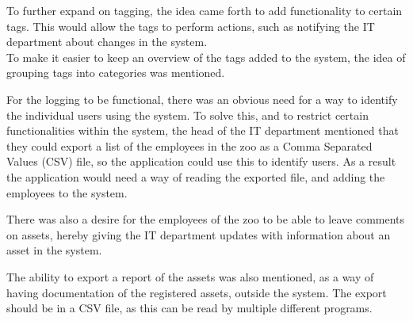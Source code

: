 \par
To further expand on tagging, the idea came forth to add functionality to certain tags. This would allow the tags to perform actions, such as notifying the IT department about changes in the system. \\
To make it easier to keep an overview of the tags added to the system, the idea of grouping tags into categories was mentioned.
\par
For the logging to be functional, there was an obvious need for a way to identify the individual users using the system. To solve this, and to restrict certain functionalities within the system, the head of the IT department mentioned that they could export a list of the employees in the zoo as a Comma Separated Values (CSV) file, so the application could use this to identify users. As a result the application would need a way of reading the exported file, and adding the employees to the system. 
\par
There was also a desire for the employees of the zoo to be able to leave comments on assets, hereby giving the IT department updates with information about an asset in the system.
\par
The ability to export a report of the assets was also mentioned, as a way of having documentation of the registered assets, outside the system. The export should be in a CSV file, as this can be read by multiple different programs.
\newpage